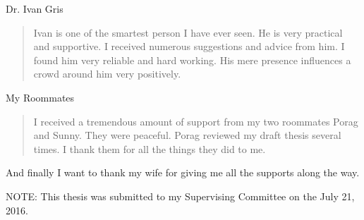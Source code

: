 \noindent
Dr. Ivan Gris
\begin{quote}
  Ivan is one of the smartest person I have ever seen. He is very practical and supportive. I received numerous suggestions and advice from him. I found him very reliable and hard working. His mere presence influences a crowd around him very positively. 
\end{quote}

\noindent
My Roommates
\begin{quote}
  I received a tremendous amount of support from my two roommates Porag and Sunny. They were peaceful. Porag reviewed my draft thesis several times. I thank them for all the things they did to me.
\end{quote}


And finally I want to thank my wife for giving me all the supports along the way. 

\vfill
\noindent
NOTE: This thesis was submitted to my Supervising Committee on the July 21, 2016.
